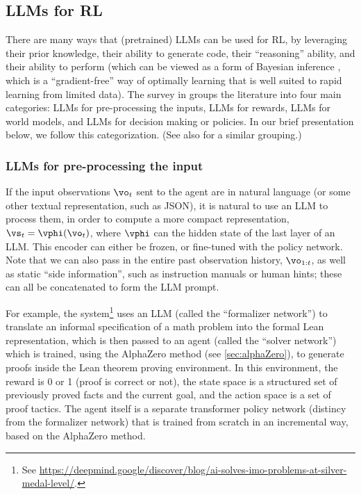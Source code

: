 \subsection{LLMs for RL}



There are many ways that (pretrained) LLMs can be used for RL,
by leveraging their prior knowledge,
their ability to generate code,
their ``reasoning'' ability,
and their ability to perform 
(which can be viewed as a form of Bayesian inference
\citep{Panwar2024}, which is a ``gradient-free'' way of
optimally learning that is well suited to 
rapid learning from limited data).
The survey in \citep{Cao2024} groups the literature into four main categories:
LLMs for pre-processing the inputs,
LLMs for rewards,
LLMs for world models,
and
LLMs for decision making or policies.
In our brief presentation below,
we follow this categorization.
(See also \citep{Spiegel2024} for a similar grouping.)

\subsubsection{LLMs for pre-processing the input}

If the input observations $\vo_t$ sent
to the agent are in natural language
(or some other textual representation, such as JSON),
it is natural to use an LLM to process them,
in order to compute a more compact
representation,  $\vs_t=\vphi(\vo_t)$,
where $\vphi$ can the hidden state of the last layer of an LLM.
This encoder can either be frozen, or fine-tuned with the policy
network.
Note that we can also pass in the entire past observation history,
$\vo_{1:t}$,
as well as  static ``side information'',
such as instruction manuals or human hints;
these can  all be concatenated to form the LLM prompt.

For example, the  system\footnote{
%
See \url{https://deepmind.google/discover/blog/ai-solves-imo-problems-at-silver-medal-level/}.
} %
uses an LLM (called the ``formalizer network'')
to translate an informal specification of a math problem
into the formal Lean representation,
which is then passed to an agent (called the ``solver network'')
which is trained,
using the AlphaZero method (see \cref{sec:alphaZero}),
to generate proofs
inside the Lean theorem proving environment.
In this environment,  the reward is 0 or 1 
(proof is correct or not),
the state space is a structured set of previously proved facts
and the current goal,
and the action space is a set of proof tactics.
The agent itself   is a separate  transformer policy network
(distincy from the formalizer network)
that is trained from scratch in an incremental way,
based on the AlphaZero method.


